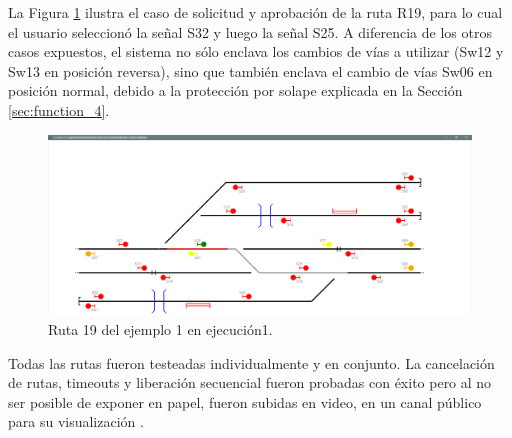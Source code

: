 	La Figura \ref{fig:EJ1_AGG_R19}	ilustra el caso de solicitud y aprobación de la ruta R19, para lo cual el usuario seleccionó la señal S32 y luego la señal S25. A diferencia de los otros casos expuestos, el sistema no sólo enclava los cambios de vías a utilizar (Sw12 y Sw13 en posición reversa), sino que también enclava el cambio de vías Sw06 en posición normal, debido a la protección por solape explicada en la Sección \ref{sec:function_4}.	
	
	\begin{figure}[H]
		\centering
		\includegraphics[origin = c, width=1\textwidth]{resultados-obtenidos/ejemplo1/images/AGG_R19}
		\centering\caption{Ruta 19 del ejemplo 1 en ejecución1.}
		\label{fig:EJ1_AGG_R19}
	\end{figure}
	
	Todas las rutas fueron testeadas individualmente y en conjunto. La cancelación de rutas, timeouts y liberación secuencial fueron probadas con éxito pero al no ser posible de exponer en papel, fueron subidas en video, en un canal público para su visualización \cite{YOUTUBE}.	
	
	